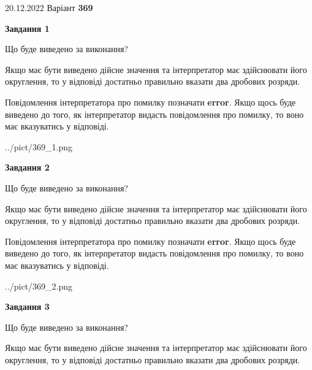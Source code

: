 \documentclass[12pt, ukrainian]{article}
\begin{document}
{20.12.2022 Варіант \No \textbf { 369 }\par}
{
\begin {Large}

{\begin {center}\textbf{Завдання 1}\end {center}}\par
Що буде виведено за виконання? \par

Якщо має бути виведено дійсне значення та інтерпретатор має здійснювати його округлення, 
то у відповіді достатньо правильно вказати два дробових розряди.

Повідомлення інтерпретатора про помилку позначати \textbf{error}.
Якщо щось буде виведено до того, як інтерпретатор видасть повідомлення про помилку, 
то воно має вказуватись у відповіді. \par

\begin{center}
	{../pict/369_1.png}
\end{center}
\newpage

{\begin {center}\textbf{Завдання 2}\end {center}}\par
Що буде виведено за виконання? \par

Якщо має бути виведено дійсне значення та інтерпретатор має здійснювати його округлення, 
то у відповіді достатньо правильно вказати два дробових розряди.

Повідомлення інтерпретатора про помилку позначати \textbf{error}.
Якщо щось буде виведено до того, як інтерпретатор видасть повідомлення про помилку, 
то воно має вказуватись у відповіді. \par

\begin{center}
	{../pict/369_2.png}
\end{center}
\newpage

{\begin {center}\textbf{Завдання 3}\end {center}}\par
Що буде виведено за виконання? \par

Якщо має бути виведено дійсне значення та інтерпретатор має здійснювати його округлення, 
то у відповіді достатньо правильно вказати два дробових розряди.


\end{Large}}
\end{document}
